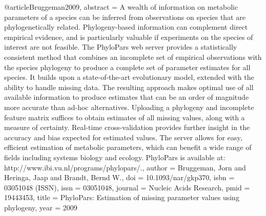 {{{{@article{Bruggeman2009,
abstract = {A wealth of information on metabolic parameters of a species can be inferred from observations on species that are phylogenetically related. Phylogeny-based information can complement direct empirical evidence, and is particularly valuable if experiments on the species of interest are not feasible. The PhyloPars web server provides a statistically consistent method that combines an incomplete set of empirical observations with the species phylogeny to produce a complete set of parameter estimates for all species. It builds upon a state-of-the-art evolutionary model, extended with the ability to handle missing data. The resulting approach makes optimal use of all available information to produce estimates that can be an order of magnitude more accurate than ad-hoc alternatives. Uploading a phylogeny and incomplete feature matrix suffices to obtain estimates of all missing values, along with a measure of certainty. Real-time cross-validation provides further insight in the accuracy and bias expected for estimated values. The server allows for easy, efficient estimation of metabolic parameters, which can benefit a wide range of fields including systems biology and ecology. PhyloPars is available at: http://www.ibi.vu.nl/programs/phylopars/.},
author = {Bruggeman, Jorn and Heringa, Jaap and Brandt, Bernd W.},
doi = {10.1093/nar/gkp370},
isbn = {03051048 (ISSN)},
issn = {03051048},
journal = {Nucleic Acids Research},
pmid = {19443453},
title = {{PhyloPars: Estimation of missing parameter values using phylogeny}},
year = {2009}
}

}}}}
